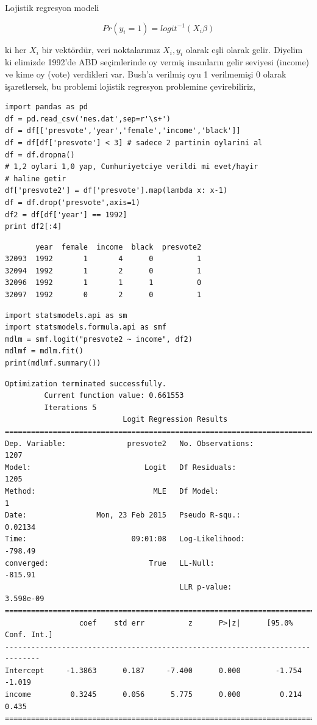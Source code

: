 \documentclass[12pt,fleqn]{article}\usepackage{../../common}
\begin{document}
Lojistik regresyon modeli 

$$ Pr(y_i=1) = logit^{-1}(X_i\beta) $$

ki her $X_i$ bir vektördür, veri noktalarımız $X_i,y_i$ olarak eşli olarak
gelir. Diyelim ki elimizde 1992'de ABD seçimlerinde oy vermiş insanların gelir
seviyesi (income) ve kime oy (vote) verdikleri var. Bush'a verilmiş oyu 1
verilmemişi 0 olarak işaretlersek, bu problemi lojistik regresyon problemine
çevirebiliriz,

\begin{verbatim}
import pandas as pd
df = pd.read_csv('nes.dat',sep=r'\s+')
df = df[['presvote','year','female','income','black']]
df = df[df['presvote'] < 3] # sadece 2 partinin oylarini al
df = df.dropna()
# 1,2 oylari 1,0 yap, Cumhuriyetciye verildi mi evet/hayir 
# haline getir
df['presvote2'] = df['presvote'].map(lambda x: x-1) 
df = df.drop('presvote',axis=1)
df2 = df[df['year'] == 1992]
print df2[:4]
\end{verbatim}

\begin{verbatim}
       year  female  income  black  presvote2
32093  1992       1       4      0          1
32094  1992       1       2      0          1
32096  1992       1       1      1          0
32097  1992       0       2      0          1
\end{verbatim}

\begin{verbatim}
import statsmodels.api as sm
import statsmodels.formula.api as smf
mdlm = smf.logit("presvote2 ~ income", df2)
mdlmf = mdlm.fit()
print(mdlmf.summary())
\end{verbatim}

\begin{verbatim}
Optimization terminated successfully.
         Current function value: 0.661553
         Iterations 5
                           Logit Regression Results                           
==============================================================================
Dep. Variable:              presvote2   No. Observations:                 1207
Model:                          Logit   Df Residuals:                     1205
Method:                           MLE   Df Model:                            1
Date:                Mon, 23 Feb 2015   Pseudo R-squ.:                 0.02134
Time:                        09:01:08   Log-Likelihood:                -798.49
converged:                       True   LL-Null:                       -815.91
                                        LLR p-value:                 3.598e-09
==============================================================================
                 coef    std err          z      P>|z|      [95.0% Conf. Int.]
------------------------------------------------------------------------------
Intercept     -1.3863      0.187     -7.400      0.000        -1.754    -1.019
income         0.3245      0.056      5.775      0.000         0.214     0.435
==============================================================================
\end{verbatim}
\end{document}
